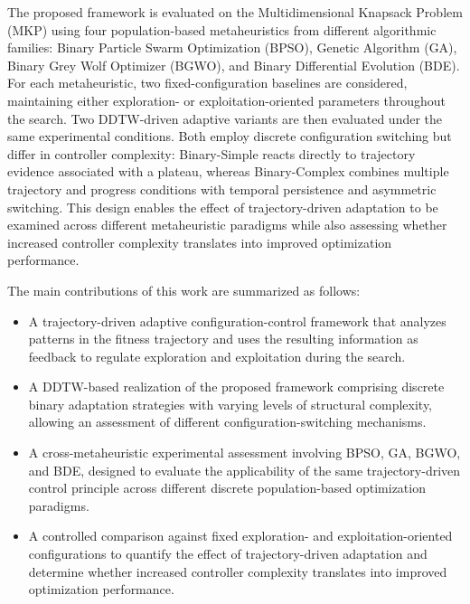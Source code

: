 \documentclass[journal,article,submit,moreauthors]{Definitions/mdpi}
\begin{document}
The proposed framework is evaluated on the Multidimensional Knapsack Problem
(MKP) using four population-based metaheuristics from different algorithmic
families: Binary Particle Swarm Optimization (BPSO), Genetic Algorithm (GA),
Binary Grey Wolf Optimizer (BGWO), and Binary Differential Evolution (BDE).
For each metaheuristic, two fixed-configuration baselines are considered,
maintaining either exploration- or exploitation-oriented parameters throughout
the search. Two DDTW-driven adaptive variants are then evaluated under the
same experimental conditions. Both employ discrete configuration switching
but differ in controller complexity: Binary-Simple reacts directly to
trajectory evidence associated with a plateau, whereas Binary-Complex
combines multiple trajectory and progress conditions with temporal
persistence and asymmetric switching. This design enables the effect of
trajectory-driven adaptation to be examined across different metaheuristic
paradigms while also assessing whether increased controller complexity
translates into improved optimization performance.

The main contributions of this work are summarized as follows:

\begin{itemize}

\item A trajectory-driven adaptive configuration-control framework that analyzes patterns in the fitness trajectory and uses the resulting information as feedback to regulate exploration and exploitation during the search.

\item A DDTW-based realization of the proposed framework comprising discrete binary adaptation strategies with varying levels of structural complexity, allowing an assessment of different configuration-switching mechanisms.

\item A cross-metaheuristic experimental assessment involving BPSO, GA, BGWO, and BDE, designed to evaluate the applicability of the same trajectory-driven control principle across different discrete population-based optimization paradigms.

\item A controlled comparison against fixed exploration- and exploitation-oriented configurations to quantify the effect of trajectory-driven adaptation and determine whether increased controller complexity translates into improved optimization performance.
\end{itemize}
\end{document}
